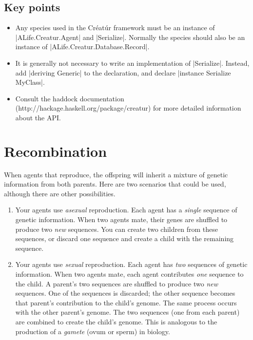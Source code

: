 \documentclass[a4paper,10pt]{report}
\begin{document}
\section{Key points}

\begin{itemize}
\item Any species used in the Créatúr framework must be an instance of |ALife.Creatur.Agent|
and |Serialize|.
Normally the species should also be an instance of |ALife.Creatur.Database.Record|.
\item It is generally not necessary to write an implementation of |Serialize|.
Instead, add |deriving Generic| to the declaration,
and declare |instance Serialize MyClass|.
\item Consult the haddock documentation (http://hackage.haskell.org/package/creatur)
for more detailed information about the API.
\end{itemize}

\chapter{Recombination}
\label{sec:recombination}

When agents that reproduce, the offspring will inherit a mixture of
genetic information from both parents.
Here are two scenarios that could be used, although there are other
possibilities.

\begin{enumerate}
\item Your agents use \emph{asexual} reproduction.
Each agent has a \emph{single} sequence of genetic information.
When two agents mate, their genes are shuffled to produce
two \emph{new} sequences.
You can create two children from these sequences,
or discard one sequence and create a child with the remaining sequence.
\item Your agents use \emph{sexual} reproduction.
Each agent has \emph{two} sequences of genetic information.
When two agents mate, each agent contributes \emph{one}
sequence to the child.
A parent's two sequences are shuffled to produce two \emph{new}
sequences.
One of the sequences is discarded; the other sequence becomes
that parent's contribution to the child's genome.
The same process occurs with the other parent's genome.
The two sequences (one from each parent) are combined to create the 
child's genome.
This is analogous to the production of a \emph{gamete} (ovum or sperm) 
in biology.
\end{enumerate}
\end{document}
